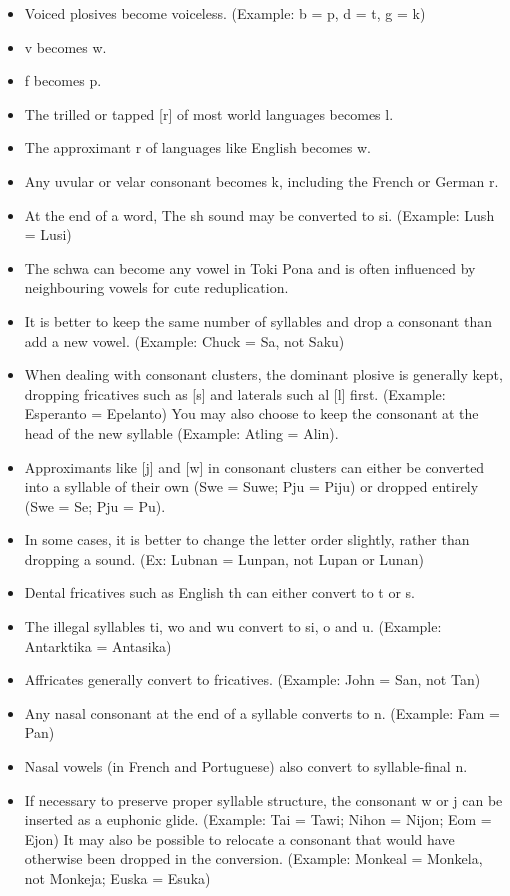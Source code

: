 \begin{itemize}
    \item Voiced plosives become voiceless. (Example: b = p, d = t, g = k)
    \item v becomes w.
    \item f becomes p.
    \item The trilled or tapped [r] of most world languages becomes l.
    \item The approximant r of languages like English becomes w.
    \item Any uvular or velar consonant becomes k, including the French or German r.
    \item At the end of a word, The sh sound may be converted to si.
          (Example: Lush = Lusi)
    \item The schwa can become any vowel in Toki Pona and is often influenced by neighbouring vowels for cute reduplication.
    \item It is better to keep the same number of syllables and drop a consonant than add a new vowel.
          (Example: Chuck = Sa, not Saku)
    \item When dealing with consonant clusters, the dominant plosive is generally kept, dropping fricatives such as [s] and laterals such al [l] first.
          (Example: Esperanto = Epelanto)
          You may also choose to keep the consonant at the head of the new syllable (Example: Atling = Alin).
    \item Approximants like [j] and [w] in consonant clusters can either be converted into a syllable of their own
          (Swe = Suwe; Pju = Piju) or dropped entirely (Swe = Se; Pju = Pu).
    \item In some cases, it is better to change the letter order slightly, rather than dropping a sound.
          (Ex: Lubnan = Lunpan, not Lupan or Lunan)
    \item Dental fricatives such as English th can either convert to t or s.
    \item The illegal syllables ti, wo and wu convert to si, o and u.
          (Example: Antarktika = Antasika)
    \item Affricates generally convert to fricatives.
          (Example: John = San, not Tan)
    \item Any nasal consonant at the end of a syllable converts to n.
          (Example: Fam = Pan)
    \item Nasal vowels (in French and Portuguese) also convert to syllable-final n.
    \item If necessary to preserve proper syllable structure, the consonant w or j can be inserted as a euphonic glide. (Example: Tai = Tawi; Nihon = Nijon; Eom = Ejon) It may also be possible to relocate a consonant that would have otherwise been dropped in the conversion. (Example: Monkeal = Monkela, not Monkeja; Euska = Esuka)

\end{itemize}
